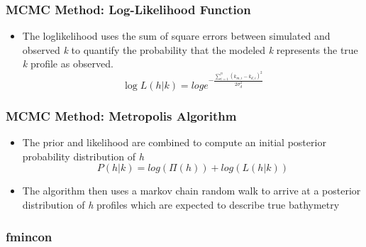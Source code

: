 \documentclass[7pt]{beamer}
\begin{document}
\begin{frame}
 \frametitle{MCMC Method: Log-Likelihood Function}
\begin{itemize}
\item The loglikelihood uses the sum of square errors between simulated and observed \textit{k} to quantify the probability that the modeled \textit{k} represents the true \textit{k} profile as observed.
\begin{equation} \label{likely}
\log{L(h|%
k)}=log{e^{- \frac{\sum\limits_{i=1}^n({k}_{m,i}-k_{d,i})^2}{2\sigma_{d}^2}}}
\end{equation} 

\end{itemize}
\end{frame}

\begin{frame}
 \frametitle{MCMC Method: Metropolis Algorithm}
\begin{itemize}
\item The prior and likelihood are combined to compute an initial posterior probability distribution of \textit{h}\\
\begin{equation}\label{post}
P(h|%
k) = log(\Pi(h)) + log(L(h|%
k))
\end{equation}
\item The algorithm then uses a markov chain random walk to %
arrive at a posterior distribution of \textit{h} profiles which are expected to describe true bathymetry
\end{itemize}
\end{frame}

 \begin{frame}
\frametitle{fmincon}


\end{frame}
\end{document}
